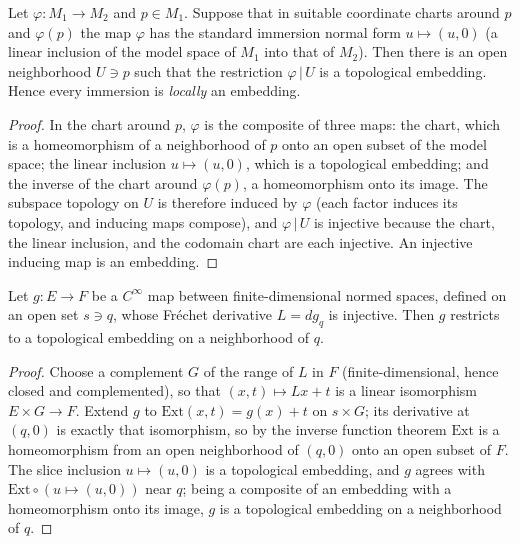 \begin{lemma}
  \label{lem:dc-ch0-3-7-embedding}


  Let $\varphi:M_1\to M_2$ and $p\in M_1$. Suppose that in suitable coordinate charts
  around $p$ and $\varphi(p)$ the map $\varphi$ has the standard immersion normal form
  $u\mapsto(u,0)$ (a linear inclusion of the model space of $M_1$ into that of $M_2$).
  Then there is an open neighborhood $U\ni p$ such that the restriction $\varphi\,|\,U$ is
  a topological embedding. Hence every immersion is \emph{locally} an embedding.
\end{lemma}
\begin{proof}
  \sketch

  In the chart around $p$, $\varphi$ is the composite of three maps: the chart, which is a
  homeomorphism of a neighborhood of $p$ onto an open subset of the model space; the linear
  inclusion $u\mapsto(u,0)$, which is a topological embedding; and the inverse of the chart
  around $\varphi(p)$, a homeomorphism onto its image. The subspace topology on $U$ is
  therefore induced by $\varphi$ (each factor induces its topology, and inducing maps
  compose), and $\varphi\,|\,U$ is injective because the chart, the linear inclusion, and
  the codomain chart are each injective. An injective inducing map is an embedding.
\end{proof}

\begin{lemma}
  \label{lem:dc-ch0-3-7-normalform}


  Let $g:E\to F$ be a $C^\infty$ map between finite-dimensional normed spaces, defined on an
  open set $s\ni q$, whose Fréchet derivative $L=dg_q$ is injective. Then $g$ restricts to a
  topological embedding on a neighborhood of $q$.
\end{lemma}
\begin{proof}
  \sketch

  Choose a complement $G$ of the range of $L$ in $F$ (finite-dimensional, hence closed and
  complemented), so that $(x,t)\mapsto Lx+t$ is a linear isomorphism $E\times G\to F$. Extend
  $g$ to $\mathrm{Ext}(x,t)=g(x)+t$ on $s\times G$; its derivative at $(q,0)$ is exactly that
  isomorphism, so by the inverse function theorem $\mathrm{Ext}$ is a homeomorphism from an
  open neighborhood of $(q,0)$ onto an open subset of $F$. The slice inclusion
  $u\mapsto(u,0)$ is a topological embedding, and $g$ agrees with $\mathrm{Ext}\circ(u\mapsto(u,0))$
  near $q$; being a composite of an embedding with a homeomorphism onto its image, $g$ is a
  topological embedding on a neighborhood of $q$.
\end{proof}

